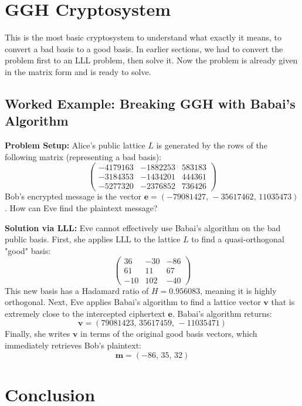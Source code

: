 \documentclass[12pt, a4paper]{article}
\theoremstyle{definition}
\theoremstyle{plain}
\begin{document}
\section{GGH Cryptosystem}

This is the most basic cryptosystem to understand what exactly it means, to convert a bad basis to a good basis. In earlier sections, we had to convert the problem first to an  LLL problem, then solve it. Now the problem is already given in the matrix form and is ready to solve.

\subsection{Worked Example: Breaking GGH with Babai's Algorithm}

\textbf{Problem Setup:} Alice's public lattice $L$ is generated by the rows of the following matrix (representing a bad basis):
\[
    \begin{pmatrix}
    -4179163 & -1882253 & 583183 \\
    -3184353 & -1434201 & 444361 \\
    -5277320 & -2376852 & 736426
    \end{pmatrix}
\]
Bob's encrypted message is the vector $\mathbf{e} = (-79081427,\, -35617462,\, 11035473)$. How can Eve find the plaintext message?

\textbf{Solution via LLL:}
Eve cannot effectively use Babai's algorithm on the bad public basis. First, she applies LLL to the lattice $L$ to find a quasi-orthogonal "good" basis:
\[
    \begin{pmatrix}
    36 & -30 & -86 \\
    61 & 11 & 67 \\
    -10 & 102 & -40
    \end{pmatrix}
\]
This new basis has a Hadamard ratio of $H = 0.956083$, meaning it is highly orthogonal. Next, Eve applies Babai's algorithm to find a lattice vector $\mathbf{v}$ that is extremely close to the intercepted ciphertext $\mathbf{e}$. Babai's algorithm returns:
\[
    \mathbf{v} = (79081423,\, 35617459,\, -11035471)
\]
Finally, she writes $\mathbf{v}$ in terms of the original good basis vectors, which immediately retrieves Bob's plaintext:
\[
    \mathbf{m} = (-86,\, 35,\, 32)
\]

\section{Conclusion}
\end{document}
